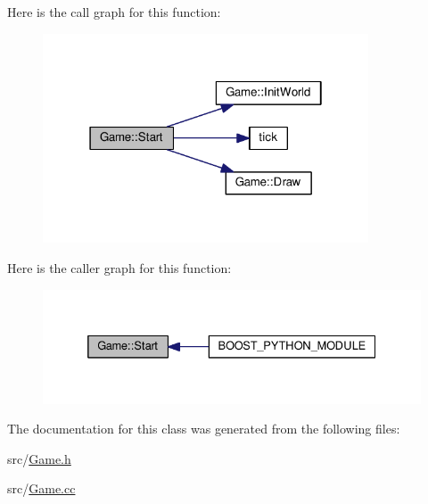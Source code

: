Here is the call graph for this function\+:
\nopagebreak
\begin{figure}[H]
\begin{center}
\leavevmode
\includegraphics[width=274pt]{class_game_adb05b20574551a26f8cf1dc664782790_cgraph}
\end{center}
\end{figure}




Here is the caller graph for this function\+:
\nopagebreak
\begin{figure}[H]
\begin{center}
\leavevmode
\includegraphics[width=332pt]{class_game_adb05b20574551a26f8cf1dc664782790_icgraph}
\end{center}
\end{figure}




The documentation for this class was generated from the following files\+:\begin{DoxyCompactItemize}
\item 
src/\hyperlink{_game_8h}{Game.\+h}\item 
src/\hyperlink{_game_8cc}{Game.\+cc}\end{DoxyCompactItemize}

